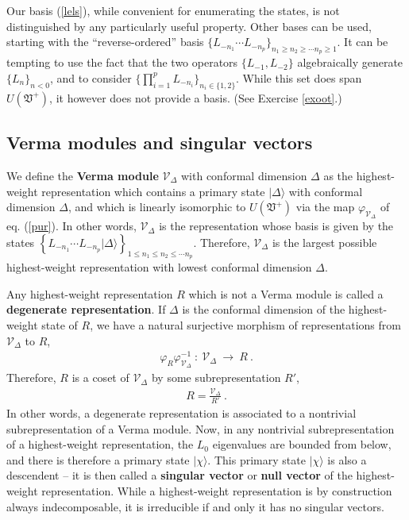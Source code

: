 \documentclass[12pt,a4paper,notitlepage]{report}
\numberwithin{equation}{section}
\theoremstyle{break}
\begin{document}
Our basis (\ref{lels}), while convenient for enumerating the states, is not distinguished by any particularly useful property. Other bases can be used, starting with the ``reverse-ordered'' basis $\{ L_{-n_1} \cdots L_{-n_p} \}_{n_1\geq n_2\geq \cdots n_p\geq 1} $. It can be tempting to use the fact that the two operators $\{L_{-1},L_{-2}\}$ algebraically generate $\{L_{n}\}_{n<0}$, and to consider $\{\prod_{i=1}^p L_{-n_i}\}_{n_i\in\{1,2\}}$. While this set does span $U(\mathfrak{V}^+)$, it however does not provide a basis. (See Exercise \ref{exoot}.)

\subsection{Verma modules and singular vectors \label{secvm}}

We define the \textbf{\boldmath Verma module} $\mathcal{V}_\Delta$ with conformal dimension $\Delta$ as the highest-weight representation which contains a primary state $|\Delta\rangle$ with conformal dimension $\Delta$, and which is linearly isomorphic to $U(\mathfrak{V}^+)$ via the map $\varphi_{\mathcal{V}_\Delta}$ of eq. (\ref{pur}). In other words, $\mathcal{V}_\Delta$ is the representation whose basis is given by the states  $\left\{ L_{-n_1} \cdots L_{-n_p}|\Delta\rangle\right\}_{1\leq n_1\leq n_2\leq \cdots n_p}$. Therefore, $\mathcal{V}_\Delta$ is the largest possible highest-weight representation with lowest conformal dimension $\Delta$. 

Any  highest-weight representation $R$ which is not a Verma module is called a \textbf{\boldmath degenerate representation}. If $\Delta$ is the conformal dimension of the highest-weight state of $R$, we have a natural surjective morphism of representations from $\mathcal{V}_\Delta$ to $R$,
\begin{align}
\varphi_R \varphi_{\mathcal{V}_\Delta}^{-1}\ : \  \mathcal{V}_\Delta\ \rightarrow\ R \ .
\end{align}
Therefore, $R$ is a coset of $\mathcal{V}_\Delta$ by some subrepresentation $R'$,
\begin{align}
 R = \frac{\mathcal{V}_\Delta}{R'}\ .
\label{rvrp}
\end{align}
In other words, a degenerate representation is associated to a nontrivial subrepresentation of a Verma module. Now, in any nontrivial subrepresentation of a highest-weight representation, the $L_0$ eigenvalues are bounded from below, and there is therefore a primary state $|\chi\rangle$. This primary state $|\chi\rangle$ is also a descendent -- it is then called a \textbf{\boldmath singular vector} or \textbf{\boldmath null vector} of the highest-weight representation. While a highest-weight representation is by construction always indecomposable, it is irreducible if and only it has no singular vectors.
\end{document}
